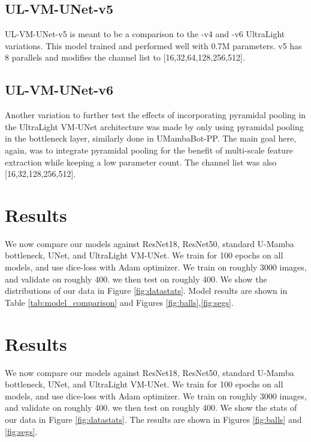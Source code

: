 \documentclass[conference]{IEEEtran}
\begin{document}
\subsection{UL-VM-UNet-v5}
UL-VM-UNet-v5 is meant to be a comparison to the -v4 and -v6 UltraLight variations. This model trained and performed well with 0.7M parameters. v5 has 8 parallels and modifies the channel list to [16,32,64,128,256,512].

\subsection{UL-VM-UNet-v6}
Another variation to further test the effects of incorporating pyramidal pooling in the UltraLight VM-UNet architecture was made by only using pyramidal pooling in the bottleneck layer, similarly done in UMambaBot-PP. The main goal here, again, was to integrate pyramidal pooling for the benefit of multi-scale feature extraction while keeping a low parameter count. The channel list was also [16,32,128,256,512].

\section{Results}
We now compare our models against ResNet18, ResNet50, standard U-Mamba bottleneck, UNet, and UltraLight VM-UNet. We train for 100 epochs on all models, and use dice-loss with Adam optimizer. We train on roughly 3000 images, and validate on roughly 400. we then test on roughly 400. We show the distributions of our data in Figure \ref{fig:datastats}.
Model results are shown in Table \ref{tab:model_comparison} and Figures \ref{fig:balls},\ref{fig:segs}.


\section{Results}
We now compare our models against ResNet18, ResNet50, standard U-Mamba bottleneck, UNet, and UltraLight VM-UNet. We train for 100 epochs on all models, and use dice-loss with Adam optimizer. We train on roughly 3000 images, and validate on roughly 400. we then test on roughly 400. We show the stats of our data in Figure \ref{fig:datastats}.
The results are shown in Figures \ref{fig:balls} and \ref{fig:segs}.
\end{document}
